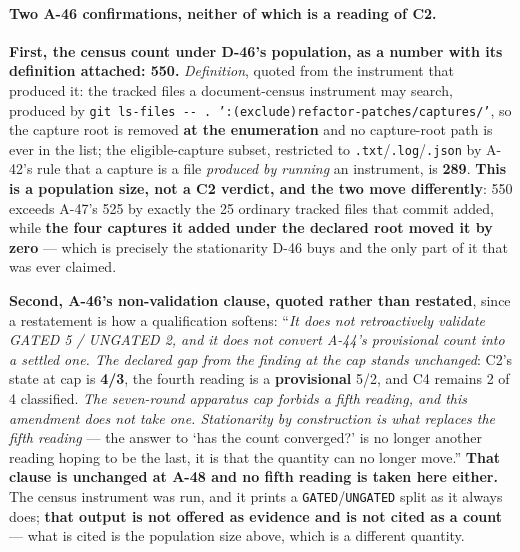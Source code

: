 \documentclass[
  10pt,
]{article}
\begin{document}
\paragraph{Two A-46 confirmations, neither of which is a reading of C2.}
\textbf{First, the census count under D-46's population, as a number with its definition attached: 550.} \emph{Definition}, quoted from the instrument that produced it: the tracked files a document-census instrument may search, produced by \texttt{git ls-files -{}- .\ ':(exclude)refactor-patches/captures/'}, so the capture root is removed \textbf{at the enumeration} and no capture-root path is ever in the list; the eligible-capture subset, restricted to \texttt{.txt}/\texttt{.log}/\texttt{.json} by A-42's rule that a capture is a file \emph{produced by running} an instrument, is \textbf{289}. \textbf{This is a population size, not a C2 verdict, and the two move differently}: 550 exceeds A-47's 525 by exactly the 25 ordinary tracked files that commit added, while \textbf{the four captures it added under the declared root moved it by zero} --- which is precisely the stationarity D-46 buys and the only part of it that was ever claimed.

\textbf{Second, A-46's non-validation clause, quoted rather than restated}, since a restatement is how a qualification softens: ``\emph{It does not retroactively validate GATED 5 / UNGATED 2, and it does not convert A-44's provisional count into a settled one. The declared gap from the finding at the cap stands unchanged}: C2's state at cap is \textbf{4/3}, the fourth reading is a \textbf{provisional} 5/2, and C4 remains 2 of 4 classified. \emph{The seven-round apparatus cap forbids a fifth reading, and this amendment does not take one. Stationarity by construction is what replaces the fifth reading} --- the answer to `has the count converged?' is no longer another reading hoping to be the last, it is that the quantity can no longer move.'' \textbf{That clause is unchanged at A-48 and no fifth reading is taken here either.} The census instrument was run, and it prints a \texttt{GATED}/\texttt{UNGATED} split as it always does; \textbf{that output is not offered as evidence and is not cited as a count} --- what is cited is the population size above, which is a different quantity.
\end{document}
